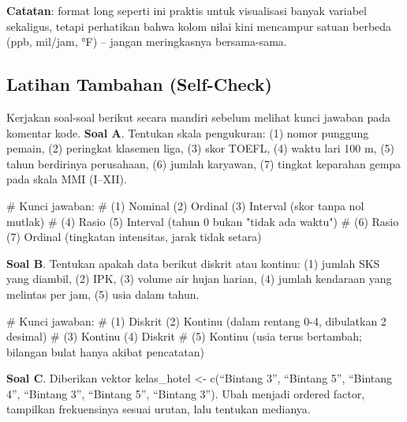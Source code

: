 \documentclass[
  indonesian,
  letterpaper,
]{book}
\newenvironment{Shaded}{\begin{snugshade}}{\end{snugshade}}
\newcommand{\CommentTok}[1]{\textcolor[rgb]{0.37,0.37,0.37}{#1}}
\begin{document}
\textbf{Catatan}: format long seperti ini praktis untuk visualisasi
banyak variabel sekaligus, tetapi perhatikan bahwa kolom nilai kini
mencampur satuan berbeda (ppb, mil/jam, °F) -- jangan meringkasnya
bersama-sama.

\subsection{Latihan Tambahan
(Self-Check)}\label{latihan-tambahan-self-check-1}

Kerjakan soal-soal berikut secara mandiri sebelum melihat kunci jawaban
pada komentar kode. \textbf{Soal A}. Tentukan skala pengukuran: (1)
nomor punggung pemain, (2) peringkat klasemen liga, (3) skor TOEFL, (4)
waktu lari 100 m, (5) tahun berdirinya perusahaan, (6) jumlah karyawan,
(7) tingkat keparahan gempa pada skala MMI (I--XII).

\begin{Shaded}
\begin{Highlighting}[]
\CommentTok{\# Kunci jawaban:}
\CommentTok{\# (1) Nominal (2) Ordinal (3) Interval (skor tanpa nol mutlak)}
\CommentTok{\# (4) Rasio (5) Interval (tahun 0 bukan "tidak ada waktu")}
\CommentTok{\# (6) Rasio (7) Ordinal (tingkatan intensitas, jarak tidak setara)}
\end{Highlighting}
\end{Shaded}

\textbf{Soal B}. Tentukan apakah data berikut diskrit atau kontinu: (1)
jumlah SKS yang diambil, (2) IPK, (3) volume air hujan harian, (4)
jumlah kendaraan yang melintas per jam, (5) usia dalam tahun.

\begin{Shaded}
\begin{Highlighting}[]
\CommentTok{\# Kunci jawaban:}
\CommentTok{\# (1) Diskrit (2) Kontinu (dalam rentang 0{-}4, dibulatkan 2 desimal)}
\CommentTok{\# (3) Kontinu (4) Diskrit}
\CommentTok{\# (5) Kontinu (usia terus bertambah; bilangan bulat hanya akibat pencatatan)}
\end{Highlighting}
\end{Shaded}

\textbf{Soal C}. Diberikan vektor kelas\_hotel \textless- c(``Bintang
3'', ``Bintang 5'', ``Bintang 4'', ``Bintang 3'', ``Bintang 5'',
``Bintang 3''). Ubah menjadi ordered factor, tampilkan frekuensinya
sesuai urutan, lalu tentukan medianya.
\end{document}
